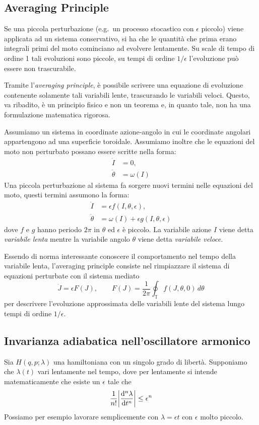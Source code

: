 \documentclass[10pt,a4paper]{article}
\begin{document}
\subsection{Averaging Principle}
\label{subsec:averaging_principle}
Se una piccola perturbazione (e.g.\ un processo stocastico con \(\epsilon \) piccolo) viene applicata ad un sistema conservativo, si ha che le quantità che prima erano integrali primi del moto cominciano ad evolvere lentamente. Su scale di tempo di ordine 1 tali evoluzioni sono piccole, su tempi di ordine \(1/\epsilon \) l'evoluzione può essere non trascurabile.

Tramite l'\textit{averaging principle}, è possibile scrivere una equazione di evoluzione contenente solamente tali variabili lente, trascurando le variabili veloci. Questo, va ribadito, è un principio fisico e non un teorema e, in quanto tale, non ha una formulazione matematica rigorosa.

Assumiamo un sistema in coordinate azione-angolo in cui le coordinate angolari appartengono ad una superficie toroidale. Assumiamo inoltre che le equazioni del moto non perturbato possano essere scritte nella forma:
\begin{align}
	\dot{I} &= 0,\\
	\dot{\theta} &= \omega(I)
\end{align}
Una piccola perturbazione al sistema fa sorgere nuovi termini nelle equazioni del moto, questi termini assumono la forma:
\begin{align}
	\dot{I} &= \epsilon f(I, \theta, \epsilon),\\
	\dot{\theta} &= \omega(I) + \epsilon g(I, \theta, \epsilon)
\end{align} 
dove $f$ e $g$ hanno periodo $2\pi$ in $\theta$ ed $\epsilon$ è piccolo. La variabile azione $I$ viene detta \textit{variabile lenta} mentre la variabile angolo $\theta$ viene detta \textit{variabile veloce}.

Essendo di norma interessante conoscere il comportamento nel tempo della variabile lenta, l'averaging principle consiste nel rimpiazzare il sistema di equazioni perturbate con il sistema mediato
\begin{equation}
	\dot{J} = \epsilon F(J), \qquad F(J) = \frac{1}{2\pi} \oint_{\mathds{T}} f(J,\theta,0)\,d\theta
\end{equation}
per descrivere l'evoluzione approssimata delle variabili lente del sistema lungo tempi di ordine $1/\epsilon$. 

\subsection{Invarianza adiabatica nell'oscillatore armonico}
Sia \(H(q,p;\lambda)\) una hamiltoniana con un singolo grado di libertà. Supponiamo che \(\lambda(t)\) vari lentamente nel tempo, dove per lentamente si intende matematicamente che esiste un \(\epsilon\) tale che
\begin{equation}
	\frac{1}{n!}\abs{\dv[n]{\lambda}{t}} \leq \epsilon^n
\end{equation}
Possiamo per esempio lavorare semplicemente con \(\lambda = \epsilon t\) con \(\epsilon\) molto piccolo.
\end{document}

